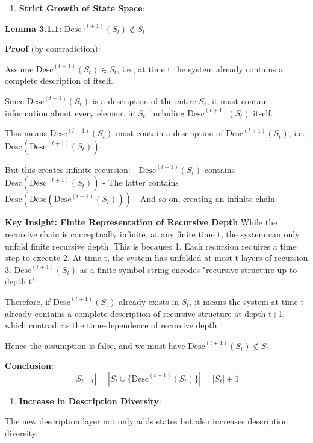 \begin{enumerate}
\item \textbf{Strict Growth of State Space}:
\end{enumerate}
   \textbf{Lemma 3.1.1}: $\text{Desc}^{(t+1)}(S_t) \notin S_t$
\label{thm:1.1}
   
   \textbf{Proof} (by contradiction):
   
   Assume $\text{Desc}^{(t+1)}(S_t) \in S_t$, i.e., at time t the system already contains a complete description of itself.
   
   Since $\text{Desc}^{(t+1)}(S_t)$ is a description of the entire $S_t$, it must contain information about every element in $S_t$, including $\text{Desc}^{(t+1)}(S_t)$ itself.
   
   This means $\text{Desc}^{(t+1)}(S_t)$ must contain a description of $\text{Desc}^{(t+1)}(S_t)$, i.e., $\text{Desc}(\text{Desc}^{(t+1)}(S_t))$.
   
   But this creates infinite recursion:
   - $\text{Desc}^{(t+1)}(S_t)$ contains $\text{Desc}(\text{Desc}^{(t+1)}(S_t))$
   - The latter contains $\text{Desc}(\text{Desc}(\text{Desc}^{(t+1)}(S_t)))$
   - And so on, creating an infinite chain
   
   \textbf{Key Insight: Finite Representation of Recursive Depth}
   While the recursive chain is conceptually infinite, at any finite time t, the system can only unfold finite recursive depth.
   This is because:
   1. Each recursion requires a time step to execute
   2. At time t, the system has unfolded at most t layers of recursion
   3. $\text{Desc}^{(t+1)}(S_t)$ as a finite symbol string encodes "recursive structure up to depth t"
   
   Therefore, if $\text{Desc}^{(t+1)}(S_t)$ already exists in $S_t$, it means the system at time t already contains
   a complete description of recursive structure at depth t+1, which contradicts the time-dependence of recursive depth.
   
   Hence the assumption is false, and we must have $\text{Desc}^{(t+1)}(S_t) \notin S_t$.
   
   \textbf{Conclusion}:
\begin{equation}
|S_{t+1}| = |S_t \cup \{\text{Desc}^{(t+1)}(S_t)\}| = |S_t| + 1
\end{equation}

\begin{enumerate}
\item \textbf{Increase in Description Diversity}:
\end{enumerate}
   The new description layer not only adds states but also increases description diversity.
   
